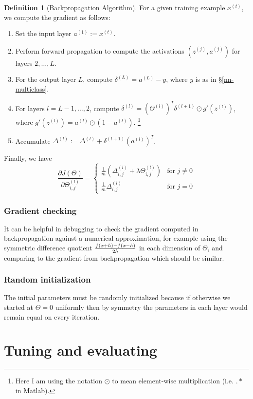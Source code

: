 \documentclass[a4paper,12pt]{article}
\theoremstyle{definition}
\newtheorem*{defn}{Definition}
\begin{document}
\begin{defn}[Backpropagation Algorithm] 
For a given training example $x^{(t)}$, we compute the gradient as follows:

\begin{enumerate}
\item Set the input layer $a^{(1)} := x^{(t)}$.
\item Perform forward propagation to compute the activations $(z^{(j)}, a^{(j)})$ for layers $2, \ldots, L$.
\item For the output layer $L$, compute $\delta^{(L)} = a^{(L)} - y$, where $y$ is as in \S\ref{nn-multiclass}.
\item For layers $l = L-1, \ldots, 2$, compute $\delta^{(l)} = (\Theta^{(l)} )^T \delta^{(l+1)} \odot g'(z^{(l)})$, where $g'(z^{(l)}) = a^{(l)} \odot (1 - a^{(l)})$. \footnote{Here I am using the notation $\odot$ to mean element-wise multiplication (i.e. $.*$ in Matlab).}
\item Accumulate $\Delta^{(l)} := \Delta^{(l)} + \delta^{(l+1)} (a^{(l)})^T$.
\end{enumerate}
Finally, we have
\[
\frac{\partial J(\Theta)}{\partial \Theta_{i,j}^{(l)}} = 
\begin{cases}
\frac{1}{m} \left( \Delta_{i,j}^{(l)}  + \lambda \Theta_{i, j}^{(l)} \right) & \text{for } j \neq 0 \\
\frac{1}{m} \Delta_{i,j}^{(l)}  & \text{for } j = 0
\end{cases}
\]
\end{defn}

\subsubsection{Gradient checking}
It can be helpful in debugging to check the gradient computed in backpropagation against a numerical approximation, for example using the symmetric difference quotient $f(x+h)-f(x-h) \over 2h$ in each dimension of $\Theta$, and comparing to the gradient from backpropagation which should be similar.

\subsubsection{Random initialization}
The initial parameters must be randomly initialized because if otherwise we started at $\Theta = 0$ uniformly then by symmetry the parameters in each layer would remain equal on every iteration.

\section{Tuning and evaluating}
\end{document}

